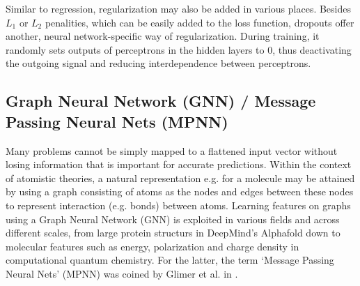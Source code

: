 Similar to regression, regularization may also be added in various places. Besides $L_1$ or $L_2$ penalities, which can be easily added to the loss function, dropouts offer another, neural network-specific way of regularization. During training, it randomly sets outputs of perceptrons in the hidden layers to 0, thus deactivating the outgoing signal and reducing interdependence between perceptrons. 

\subsection{Graph Neural Network (GNN) / Message Passing Neural Nets (MPNN)}
\label{subsec:background_gnn}
Many problems cannot be simply mapped to a flattened input vector without losing information that is important for accurate predictions. Within the context of atomistic theories, a natural representation e.g. for a molecule may be attained by using a graph consisting of atoms as the nodes and edges between these nodes to represent interaction (e.g. bonds) between atoms. Learning features on graphs using a Graph Neural Network (GNN) is exploited in various fields and across different scales, from large protein structurs in DeepMind's Alphafold \parencite{ref:alphafold} down to molecular features such as energy, polarization and charge density in computational quantum chemistry. For the latter, the term `Message Passing Neural Nets' (MPNN) was coined by Glimer et al. in \parencite{ref:gilmer2017neural}.

